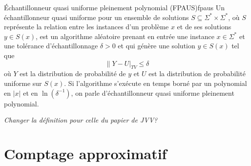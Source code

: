 \begin{maindefinition}{Échantillonneur quasi uniforme pleinement polynomial (FPAUS)}{fpaus}
    Un échantillonneur quasi uniforme pour un ensemble de solutions $S \subseteq \Sigma^{*} \times \Sigma^{*}$, où $S$ représente la relation entre les instances d'un problème $x$ et de ses solutions $y \in  S(x)$, est un algorithme aléatoire prenant en entrée une instance $x \in \Sigma^{*}$ et une tolérance d'échantillonnage $\delta > 0$ et qui génère une solution $y \in S(x)$ tel que
    \begin{equation*}
        \lVert Y - U \rvert_{TV} \leq \delta 
    \end{equation*}
    où $Y$ est la distribution de probabilité de $y$ et $U$ est la distribution de probabilité uniforme sur $S(x)$. Si l'algorithme s'exécute en temps borné par un polynomial en $\lvert x \rvert$ et en $\ln (\delta^{-1})$, on parle d'échantillonneur quasi uniforme pleinement polynomial.
\end{maindefinition}

\textcolor{mydarkred}{\textit{Changer la définition pour celle du papier de JVV?}}


\section{Comptage approximatif}

